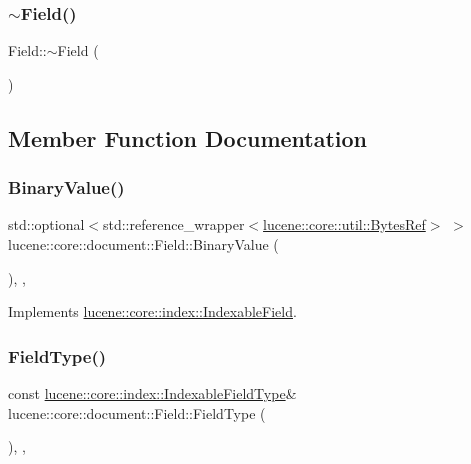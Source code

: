 \subsubsection{\texorpdfstring{$\sim$\+Field()}{~Field()}}
{\footnotesize\ttfamily Field\+::$\sim$\+Field (\begin{DoxyParamCaption}{ }\end{DoxyParamCaption})\hspace{0.3cm}{\ttfamily [virtual]}}



\subsection{Member Function Documentation}
\mbox{\label{classlucene_1_1core_1_1document_1_1Field_a5415bfa7681238c59d6e0acb2da13bd4}} 
\subsubsection{\texorpdfstring{Binary\+Value()}{BinaryValue()}}
{\footnotesize\ttfamily std\+::optional$<$std\+::reference\+\_\+wrapper$<$\mbox{\hyperlink{classlucene_1_1core_1_1util_1_1BytesRef}{lucene\+::core\+::util\+::\+Bytes\+Ref}}$>$ $>$ lucene\+::core\+::document\+::\+Field\+::\+Binary\+Value (\begin{DoxyParamCaption}{ }\end{DoxyParamCaption})\hspace{0.3cm}{\ttfamily [inline]}, {\ttfamily [virtual]}, {\ttfamily [noexcept]}}



Implements \mbox{\hyperlink{classlucene_1_1core_1_1index_1_1IndexableField_a77b0b5e4f1ae25eaaab3d9f13b9204cb}{lucene\+::core\+::index\+::\+Indexable\+Field}}.

\mbox{\label{classlucene_1_1core_1_1document_1_1Field_ab6ffe62bb06b157049af54cd2b674007}} 
\subsubsection{\texorpdfstring{Field\+Type()}{FieldType()}}
{\footnotesize\ttfamily const \mbox{\hyperlink{classlucene_1_1core_1_1index_1_1IndexableFieldType}{lucene\+::core\+::index\+::\+Indexable\+Field\+Type}}\& lucene\+::core\+::document\+::\+Field\+::\+Field\+Type (\begin{DoxyParamCaption}{ }\end{DoxyParamCaption})\hspace{0.3cm}{\ttfamily [inline]}, {\ttfamily [virtual]}, {\ttfamily [noexcept]}}



